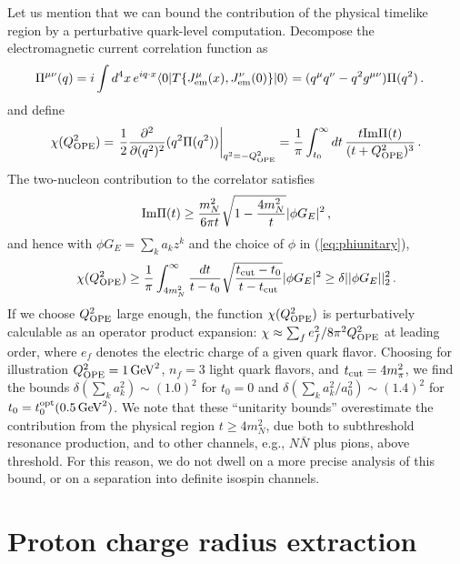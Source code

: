 \documentclass[12pt]{article}
\begin{document}
Let us mention that we can bound the contribution of the physical timelike region by a perturbative 
quark-level computation.   Decompose the electromagnetic current correlation function as 
\begin{align}
\Pi^{\mu\nu}(q) &=  i \int d^4x\, e^{iq\cdot x} \langle 0 | T\{ J_{\rm em}^\mu(x), J_{\rm em}^\nu(0) \} |0\rangle  
= (q^\mu q^\nu - q^2 g^{\mu\nu} ) \Pi(q^2) \,.
\end{align} 
and define 
\begin{align}
\chi(Q_{\rm OPE}^2) = \left. \frac12 {\partial^2 \over \partial (q^2)^2} ( q^2 \Pi(q^2) ) \right|_{q^2=-Q^2_{\rm OPE}}  
= {1\over \pi} \int_{t_0}^\infty dt\, {t {\rm Im} \Pi(t) \over (t+Q_{\rm OPE}^2)^3 } \,.
\end{align}
The two-nucleon contribution to the correlator satisfies 
\begin{align} 
{\rm Im} \Pi(t)  
\ge 
{m_N^2 \over  6 \pi t} \sqrt{1-{4m_N^2\over t}}  |\phi G_E|^2  \,, 
\end{align} 
and hence with $\phi G_E = \sum_k a_k z^k$ and the choice of $\phi$ in (\ref{eq:phiunitary}), 
 \begin{align}
\chi(Q_{\rm OPE}^2)
\ge {1\over \pi} 
\int_{4m_N^2}^\infty {dt\over t-t_0}  
  \sqrt{ t_{\rm cut} - t_0 \over t-t_{\rm cut}} |\phi G_E|^2 
 \ge \delta  || \phi G_E ||_2^2  \,. 
 \end{align}
If we choose $Q_{\rm OPE}^2$ large enough, the function $\chi(Q_{\rm OPE}^2)$ is perturbatively calculable
as an operator product expansion: 
$\chi \approx \sum_f e_f^2 / 8\pi^2 Q_{\rm OPE}^2$ at leading order, where $e_f$ denotes 
the electric charge of a given quark flavor.
Choosing for illustration $Q_{\rm OPE}^2 = 1\,{\rm GeV}^2$, $n_f = 3$ light quark flavors,  
and $t_{\rm cut}=4m_\pi^2$, 
we find the bounds $\delta( \sum_k a_k^2 ) \sim (1.0)^2$ for $t_0=0$ 
and $\delta( \sum_k a_k^2/a_0^2 ) \sim (1.4)^2$ for $t_0=t_0^{\rm opt}(0.5\,{\rm GeV}^2)$.
We note that these ``unitarity bounds'' overestimate the contribution 
from the physical region $t\ge 4m_N^2$, due both to subthreshold 
resonance production, and to other channels, e.g., $N\bar{N}$ plus pions, above threshold.   
For this reason, we do not dwell on a more precise analysis of this bound, 
or on a separation into definite isospin channels.


\section{Proton charge radius extraction \label{sec:more}} 
\end{document}

